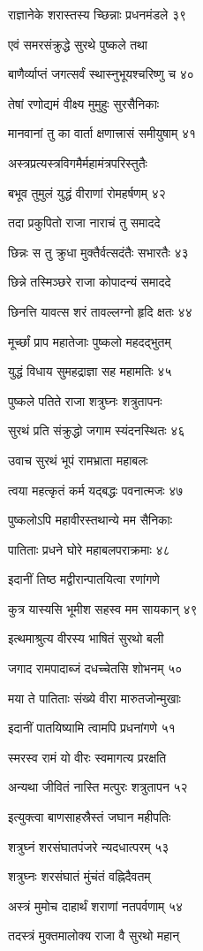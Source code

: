 राज्ञानेके शरास्तस्य च्छिन्नाः प्रधनमंडले ३९

एवं समरसंक्रुद्धे सुरथे पुष्कले तथा

बाणैर्व्याप्तं जगत्सर्वं स्थास्नुभूयश्चरिष्णु च ४०

तेषां रणोद्यमं वीक्ष्य मुमुहुः सुरसैनिकाः

मानवानां तु का वार्ता क्षणात्त्रासं समीयुषाम् ४१

अस्त्रप्रत्यस्त्रविगमैर्महामंत्रपरिस्तुतैः

बभूव तुमुलं युद्धं वीराणां रोमहर्षणम् ४२

तदा प्रकुपितो राजा नाराचं तु समाददे

छिन्नः स तु क्रुधा मुक्तैर्वत्सदंतैः सभारतैः ४३

छिन्ने तस्मिञ्छरे राजा कोपादन्यं समाददे

छिनत्ति यावत्स शरं तावल्लग्नो हृदि क्षतः ४४

मूर्च्छां प्राप महातेजाः पुष्कलो महदद्भुतम्

युद्धं विधाय सुमहद्राज्ञा सह महामतिः ४५

पुष्कले पतिते राजा शत्रुघ्नः शत्रुतापनः

सुरथं प्रति संक्रुद्धो जगाम स्यंदनस्थितः ४६

उवाच सुरथं भूपं रामभ्राता महाबलः

त्वया महत्कृतं कर्म यद्बद्धः पवनात्मजः ४७

पुष्कलोऽपि महावीरस्तथान्ये मम सैनिकाः

पातिताः प्रधने घोरे महाबलपराक्रमाः ४८

इदानीं तिष्ठ मद्वीरान्पातयित्वा रणांगणे

कुत्र यास्यसि भूमीश सहस्व मम सायकान् ४९

इत्थमाश्रुत्य वीरस्य भाषितं सुरथो बली

जगाद रामपादाब्जं दधच्चेतसि शोभनम् ५०

मया ते पातिताः संख्ये वीरा मारुतजोन्मुखाः

इदानीं पातयिष्यामि त्वामपि प्रधनांगणे ५१

स्मरस्व रामं यो वीरः स्वमागत्य प्ररक्षति

अन्यथा जीवितं नास्ति मत्पुरः शत्रुतापन ५२

इत्युक्त्वा बाणसाहस्रैस्तं जघान महीपतिः

शत्रुघ्नं शरसंघातपंजरे न्यदधात्परम् ५३

शत्रुघ्नः शरसंघातं मुंचंतं वह्निदैवतम्

अस्त्रं मुमोच दाहार्थं शराणां नतपर्वणाम् ५४

तदस्त्रं मुक्तमालोक्य राजा वै सुरथो महान्

